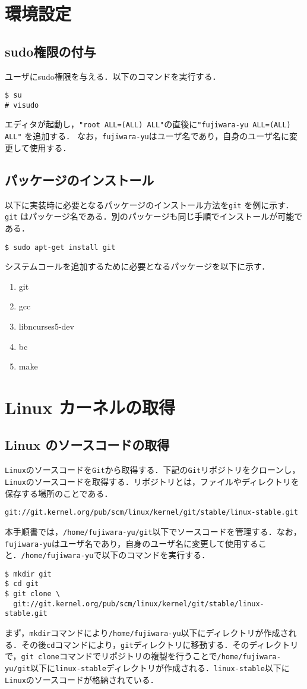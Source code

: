 \documentclass[12pt]{jsarticle}
\begin{document}
\section{環境設定}\label{sec:config}
\subsection{sudo権限の付与}
ユーザにsudo権限を与える．以下のコマンドを実行する．
\begin{verbatim}
$ su
# visudo
\end{verbatim}
エディタが起動し，\verb|"root ALL=(ALL) ALL"|の直後に\verb|"fujiwara-yu ALL=(ALL) ALL"| を追加する．
なお，\verb|fujiwara-yu|はユーザ名であり，自身のユーザ名に変更して使用する．

\subsection{パッケージのインストール}
以下に実装時に必要となるパッケージのインストール方法を\verb|git| を例に示す．
\verb|git| はパッケージ名である．別のパッケージも同じ手順でインストールが可能である．
\begin{verbatim}
$ sudo apt-get install git
\end{verbatim}
システムコールを追加するために必要となるパッケージを以下に示す．
\begin{enumerate}
\item git
\item gcc
\item libncurses5-dev
\item bc
\item make
\end{enumerate}

\section{Linux カーネルの取得}\label{sec:kernel}
\subsection{Linux のソースコードの取得}
\verb|Linux|のソースコードを\verb|Git|から取得する．下記の\verb|Git|リポジトリをクローンし，\verb|Linux|のソースコードを取得する．リポジトリとは，ファイルやディレクトリを保存する場所のことである．
\begin{verbatim}
git://git.kernel.org/pub/scm/linux/kernel/git/stable/linux-stable.git
\end{verbatim}
本手順書では，\verb|/home/fujiwara-yu/git|以下でソースコードを管理する．なお，\verb|fujiwara-yu|はユーザ名であり，自身のユーザ名に変更して使用すること．\verb|/home/fujiwara-yu|で以下のコマンドを実行する．
\begin{verbatim}
$ mkdir git
$ cd git
$ git clone \
  git://git.kernel.org/pub/scm/linux/kernel/git/stable/linux-stable.git
\end{verbatim}
まず，\verb|mkdir|コマンドにより\verb|/home/fujiwara-yu|以下にディレクトリが作成される．その後\verb|cd|コマンドにより，\verb|git|ディレクトリに移動する．そのディレクトリで，\verb|git clone|コマンドでリポジトリの複製を行うことで\verb|/home/fujiwara-yu/git|以下に\verb|linux-stable|ディレクトリが作成される．\verb|linux-stable|以下に\verb|Linux|のソースコードが格納されている．
\end{document}

